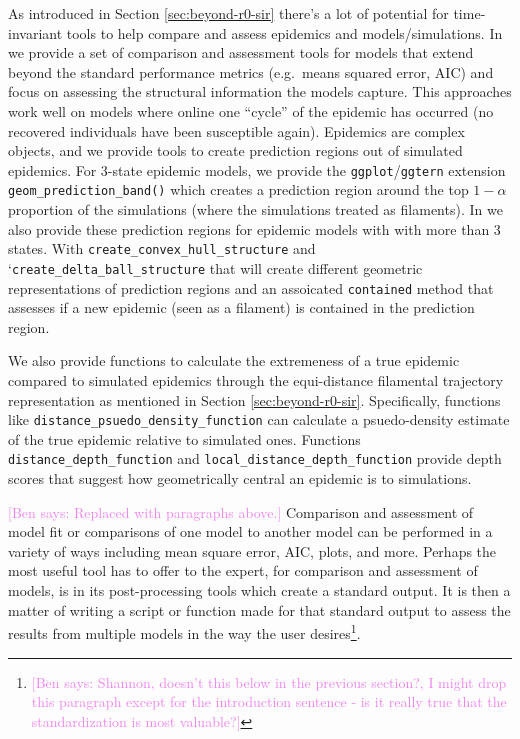 \documentclass[
  shortnames]{jss}
\begin{document}
As introduced in Section \ref{sec:beyond-r0-sir} there's a lot of
potential for time-invariant tools to help compare and assess epidemics
and models/simulations. In  we provide a set of
comparison and assessment tools for models that extend beyond the
standard performance metrics (e.g.~means squared error, AIC) and focus
on assessing the structural information the models capture. This
approaches work well on models where online one ``cycle'' of the
epidemic has occurred (no recovered individuals have been susceptible
again). Epidemics are complex objects, and we provide tools to create
prediction regions out of simulated epidemics. For 3-state epidemic
models, we provide the \texttt{ggplot}/\texttt{ggtern} extension
\texttt{geom\_prediction\_band()} which creates a prediction region
around the top \(1-\alpha\) proportion of the simulations (where the
simulations treated as filaments). In  we also provide
these prediction regions for epidemic models with with more than 3
states. With \texttt{create\_convex\_hull\_structure} and
`\texttt{create\_delta\_ball\_structure} that will create different
geometric representations of prediction regions and an assoicated
\texttt{contained} method that assesses if a new epidemic (seen as a
filament) is contained in the prediction region.

We also provide functions to calculate the extremeness of a true
epidemic compared to simulated epidemics through the equi-distance
filamental trajectory representation as mentioned in Section
\ref{sec:beyond-r0-sir}. Specifically, functions like
\texttt{distance\_psuedo\_density\_function} can calculate a
psuedo-density estimate of the true epidemic relative to simulated ones.
Functions \texttt{distance\_depth\_function} and
\texttt{local\_distance\_depth\_function} provide depth scores that
suggest how geometrically central an epidemic is to simulations.

\textcolor{violet}{[Ben says: Replaced with paragraphs above.]}
Comparison and assessment of model fit or comparisons of one model to
another model can be performed in a variety of ways including mean
square error, AIC, plots, and more. Perhaps the most useful tool
 has to offer to the expert, for comparison and
assessment of models, is in its post-processing tools which create a
standard output. It is then a matter of writing a script or function
made for that standard output to assess the results from multiple models
in the way the user
desires\footnote{\textcolor{violet}{[Ben says: Shannon, doesn't this below in the previous section?, I might drop this paragraph except for the introduction sentence - is it really true that the standardization is most valuable?]}}.
\end{document}
